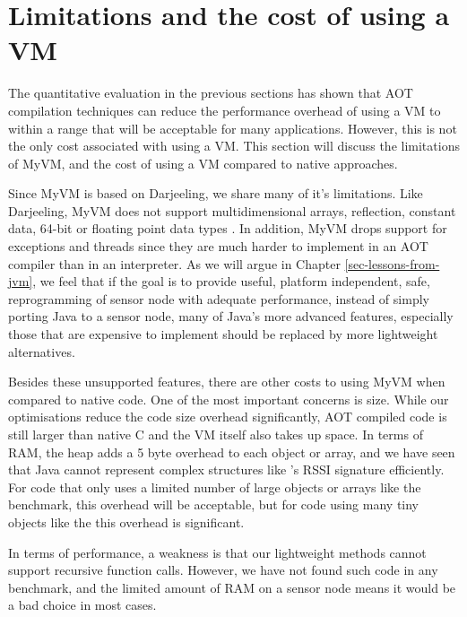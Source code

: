 \section{Limitations and the cost of using a VM}
\label{sec-evaluation-limitations}
The quantitative evaluation in the previous sections has shown that AOT compilation techniques can reduce the performance overhead of using a VM to within a range that will be acceptable for many applications. However, this is not the only cost associated with using a VM. This section will discuss the limitations of MyVM, and the cost of using a VM compared to native approaches.

Since MyVM is based on Darjeeling, we share many of it's limitations. Like Darjeeling, MyVM does not support multidimensional arrays, reflection, constant data, 64-bit or floating point data types \cite{Brouwers:2009cj}. In addition, MyVM drops support for exceptions and threads since they are much harder to implement in an AOT compiler than in an interpreter. As we will argue in Chapter \ref{sec-lessons-from-jvm}, we feel that if the goal is to provide useful, platform independent, safe, reprogramming of sensor node with adequate performance, instead of simply porting Java to a sensor node, many of Java's more advanced features, especially those that are expensive to implement should be replaced by more lightweight alternatives.

Besides these unsupported features, there are other costs to using MyVM when compared to native code. One of the most important concerns is size. While our optimisations reduce the code size overhead significantly, AOT compiled code is still larger than native C and the VM itself also takes up space. In terms of RAM, the heap adds a 5 byte overhead to each object or array, and we have seen that Java cannot represent complex structures like 's RSSI signature efficiently. For code that only uses a limited number of large objects or arrays like the  benchmark, this overhead will be acceptable, but for code using many tiny objects like the  this overhead is significant.

In terms of performance, a weakness is that our lightweight methods cannot support recursive function calls. However, we have not found such code in any benchmark, and the limited amount of RAM on a sensor node means it would be a bad choice in most cases.

